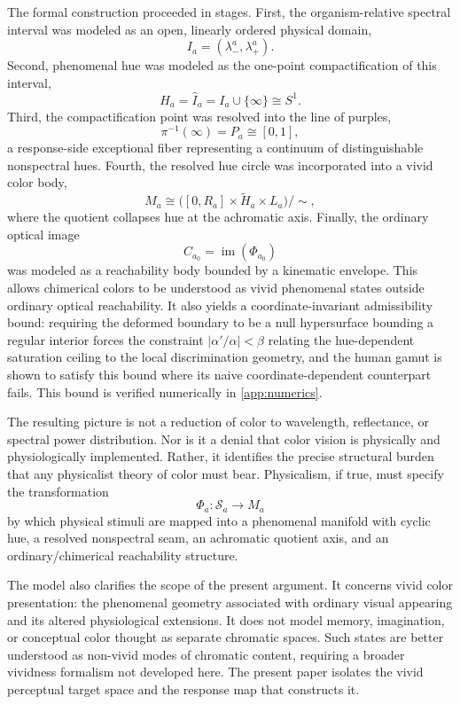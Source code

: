 \documentclass[preprint,12pt,authoryear]{elsarticle}
\theoremstyle{plain}
\theoremstyle{definition}
\theoremstyle{remark}
\begin{document}
The formal construction proceeded in stages. First, the organism-relative spectral interval was modeled as an open, linearly ordered physical domain,
\[
I_a=(\lambda_-^a,\lambda_+^a).
\]
Second, phenomenal hue was modeled as the one-point compactification of this interval,
\[
H_a=\widehat I_a=I_a\cup\{\infty\}\cong S^1.
\]
Third, the compactification point was resolved into the line of purples,
\[
\pi^{-1}(\infty)=P_a\cong[0,1],
\]
a response-side exceptional fiber representing a continuum of distinguishable nonspectral hues. Fourth, the resolved hue circle was incorporated into a vivid color body,
\[
M_a\cong\bigl([0,R_a]\times\widetilde H_a\times L_a\bigr)/{\sim},
\]
where the quotient collapses hue at the achromatic axis. Finally, the ordinary optical image
\[
C_{a_0}=\operatorname{im}(\Phi_{a_0})
\]
was modeled as a reachability body bounded by a kinematic envelope. This allows chimerical colors to be understood as vivid phenomenal states outside ordinary optical reachability. It also yields a coordinate-invariant admissibility bound: requiring the deformed boundary to be a null hypersurface bounding a regular interior forces the constraint $|\alpha'/\alpha| < \beta$ relating the hue-dependent saturation ceiling to the local discrimination geometry, and the human gamut is shown to satisfy this bound where its naive coordinate-dependent counterpart fails. This bound is verified numerically in \ref{app:numerics}.

The resulting picture is not a reduction of color to wavelength, reflectance, or spectral power distribution. Nor is it a denial that color vision is physically and physiologically implemented. Rather, it identifies the precise structural burden that any physicalist theory of color must bear. Physicalism, if true, must specify the transformation
\[
\Phi_a:\mathcal{S}_a\longrightarrow M_a
\]
by which physical stimuli are mapped into a phenomenal manifold with cyclic hue, a resolved nonspectral seam, an achromatic quotient axis, and an ordinary/chimerical reachability structure.

The model also clarifies the scope of the present argument. It concerns vivid color presentation: the phenomenal geometry associated with ordinary visual appearing and its altered physiological extensions. It does not model memory, imagination, or conceptual color thought as separate chromatic spaces. Such states are better understood as non-vivid modes of chromatic content, requiring a broader vividness formalism not developed here. The present paper isolates the vivid perceptual target space and the response map that constructs it.
\end{document}
